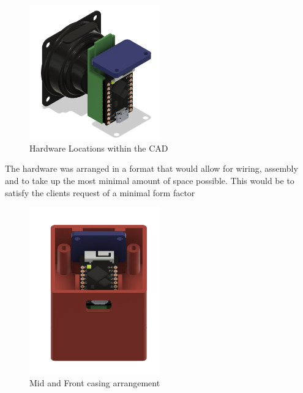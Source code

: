 {    \begin{figure}[ht!]
        \centering %
            \includegraphics[width=0.5\textwidth,keepaspectratio, angle=0]{./figures/hardware.png}
            \caption{Hardware Locations within the CAD}
        \label{fig:hardware}
    \end{figure}

The hardware was arranged in a format that would allow for wiring, assembly and to take up the most minimal amount of space possible. This would be to satisfy the clients request of a minimal form factor

    \begin{figure}[ht!]
        \centering %
            \includegraphics[width=0.5\textwidth,keepaspectratio, angle=0]{./figures/interior.png}
            \caption{Mid and Front casing arrangement}
            

\end{figure}}
